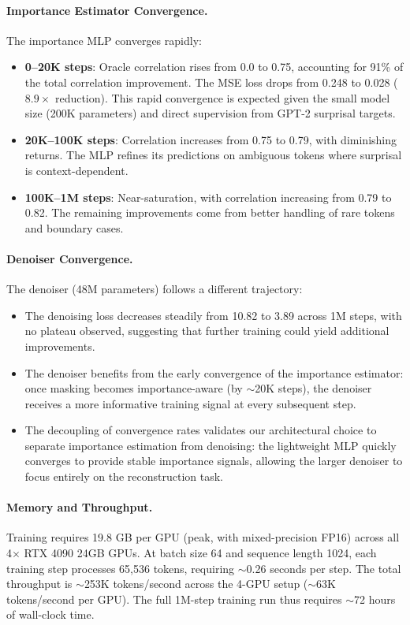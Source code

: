 \paragraph{Importance Estimator Convergence.} The importance MLP converges rapidly:
\begin{itemize}[leftmargin=*,itemsep=1pt]
    \item \textbf{0--20K steps}: Oracle correlation rises from 0.0 to 0.75, accounting for 91\% of the total correlation improvement. The MSE loss drops from 0.248 to 0.028 ($8.9\times$ reduction). This rapid convergence is expected given the small model size (200K parameters) and direct supervision from GPT-2 surprisal targets.
    \item \textbf{20K--100K steps}: Correlation increases from 0.75 to 0.79, with diminishing returns. The MLP refines its predictions on ambiguous tokens where surprisal is context-dependent.
    \item \textbf{100K--1M steps}: Near-saturation, with correlation increasing from 0.79 to 0.82. The remaining improvements come from better handling of rare tokens and boundary cases.
\end{itemize}

\paragraph{Denoiser Convergence.} The denoiser (48M parameters) follows a different trajectory:
\begin{itemize}[leftmargin=*,itemsep=1pt]
    \item The denoising loss decreases steadily from 10.82 to 3.89 across 1M steps, with no plateau observed, suggesting that further training could yield additional improvements.
    \item The denoiser benefits from the early convergence of the importance estimator: once masking becomes importance-aware (by ${\sim}$20K steps), the denoiser receives a more informative training signal at every subsequent step.
    \item The decoupling of convergence rates validates our architectural choice to separate importance estimation from denoising: the lightweight MLP quickly converges to provide stable importance signals, allowing the larger denoiser to focus entirely on the reconstruction task.
\end{itemize}

\paragraph{Memory and Throughput.} Training requires 19.8 GB per GPU (peak, with mixed-precision FP16) across all 4$\times$ RTX 4090 24GB GPUs. At batch size 64 and sequence length 1024, each training step processes 65,536 tokens, requiring ${\sim}$0.26 seconds per step. The total throughput is ${\sim}$253K tokens/second across the 4-GPU setup (${\sim}$63K tokens/second per GPU). The full 1M-step training run thus requires ${\sim}$72 hours of wall-clock time.

